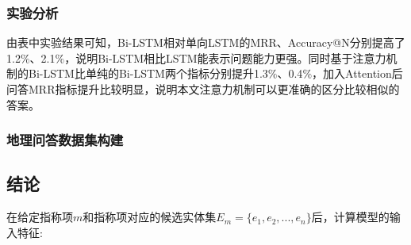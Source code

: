 \subsubsection{实验分析}
由表中实验结果可知，Bi-LSTM相对单向LSTM的MRR、Accuracy@N分别提高了1.2$\%$、2.1$\%$，说明Bi-LSTM相比LSTM能表示问题能力更强。同时基于注意力机制的Bi-LSTM比单纯的Bi-LSTM两个指标分别提升1.3$\%$、0.4$\%$，加入Attention后问答MRR指标提升比较明显，说明本文注意力机制可以更准确的区分比较相似的答案。

\subsubsection{地理问答数据集构建}
\subsection{结论}









在给定指称项$m$和指称项对应的候选实体集$E_m=\{e_1,e_2,...,e_n\}$后，计算模型的输入特征:

